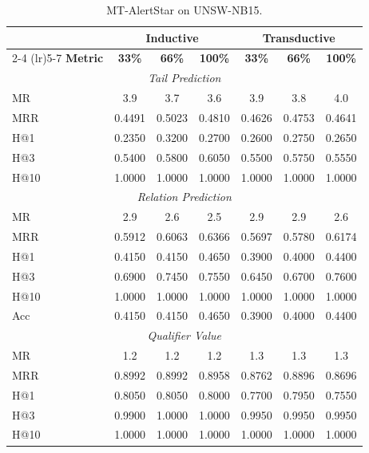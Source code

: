 \documentclass[10pt,journal,compsoc]{IEEEtran}
\begin{document}
\begin{table}[ht]
\tiny
\centering
\caption{MT-AlertStar on UNSW-NB15.}
\label{tab:multitask_alertstar_full_unsw}
\begin{tabular}{l ccc ccc}
\toprule
\multicolumn{1}{c}{} & \multicolumn{3}{c}{\textbf{Inductive}} & \multicolumn{3}{c}{\textbf{Transductive}} \\
\cmidrule(lr){2-4} \cmidrule(lr){5-7}
\textbf{Metric} & \textbf{33\%} & \textbf{66\%} & \textbf{100\%} & \textbf{33\%} & \textbf{66\%} & \textbf{100\%} \\
\midrule
\multicolumn{7}{c}{\textit{Tail Prediction}} \\
\midrule
MR  & 3.9    & 3.7    & 3.6 & 3.9    & 3.8    & 4.0 \\
MRR & 0.4491 & 0.5023 & 0.4810 & 0.4626 & 0.4753 & 0.4641 \\
H@1 & 0.2350 & 0.3200 & 0.2700 & 0.2600 & 0.2750 & 0.2650 \\
H@3 & 0.5400 & 0.5800 & 0.6050 & 0.5500 & 0.5750 & 0.5550 \\
H@10& 1.0000 & 1.0000 & 1.0000 & 1.0000 & 1.0000 & 1.0000 \\
\midrule
\multicolumn{7}{c}{\textit{Relation Prediction}} \\
\midrule
MR  & 2.9    & 2.6    & 2.5 & 2.9    & 2.9    & 2.6 \\
MRR & 0.5912 & 0.6063 & 0.6366 & 0.5697 & 0.5780 & 0.6174 \\
H@1 & 0.4150 & 0.4150 & 0.4650 & 0.3900 & 0.4000 & 0.4400 \\
H@3 & 0.6900 & 0.7450 & 0.7550 & 0.6450 & 0.6700 & 0.7600 \\
H@10& 1.0000 & 1.0000 & 1.0000 & 1.0000 & 1.0000 & 1.0000 \\
Acc & 0.4150 & 0.4150 & 0.4650 & 0.3900 & 0.4000 & 0.4400 \\
\midrule
\multicolumn{7}{c}{\textit{Qualifier Value}} \\
\midrule
MR  & 1.2    & 1.2    & 1.2 & 1.3    & 1.3    & 1.3 \\
MRR & 0.8992 & 0.8992 & 0.8958 & 0.8762 & 0.8896 & 0.8696 \\
H@1 & 0.8050 & 0.8050 & 0.8000 & 0.7700 & 0.7950 & 0.7550 \\
H@3 & 0.9900 & 1.0000 & 1.0000 & 0.9950 & 0.9950 & 0.9950 \\
H@10& 1.0000 & 1.0000 & 1.0000 & 1.0000 & 1.0000 & 1.0000 \\
\bottomrule
\end{tabular}
\end{table}
\end{document}
